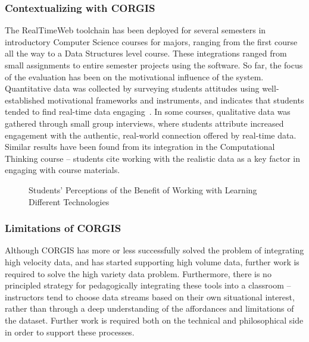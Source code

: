 \subsubsection{Contextualizing with CORGIS}

The RealTimeWeb toolchain has been deployed for several semesters in introductory Computer Science courses for majors, ranging from the first course all the way to a Data Structures level course.
These integrations ranged from small assignments to entire semester projects using the software.
So far, the focus of the evaluation has been on the motivational influence of the system.
Quantitative data was collected by surveying students attitudes using well-established motivational frameworks and instruments, and indicates that students tended to find real-time data engaging~\cite{realtimeweb}.
In some courses, qualitative data was gathered through small group interviews, where students attribute increased engagement with the authentic, real-world connection offered by real-time data.
Similar results have been found from its integration in the Computational Thinking course -- students cite working with the realistic data as a key factor in engaging with course materials.

\begin{wrapfigure}{R}{0.5\textwidth}
		\begin{center}
		\end{center}
		\caption{Students' Perceptions of the Benefit of Working with Learning Different Technologies}
		\label{fig-expected-benefit}
\end{wrapfigure}

\subsubsection{Limitations of CORGIS}

Although CORGIS has more or less successfully solved the problem of integrating high velocity data, and has started supporting high volume data, further work is required to solve the high variety data problem.
Furthermore, there is no principled strategy for pedagogically integrating these tools into a classroom -- instructors tend to choose data streams based on their own situational interest, rather than through a deep understanding of the affordances and limitations of the dataset.
Further work is required both on the technical and philosophical side in order to support these processes.

